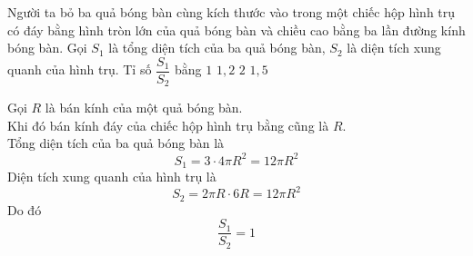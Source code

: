 \begin{ex}%
 Người ta bỏ ba quả bóng bàn cùng kích thước vào trong một chiếc hộp hình trụ có đáy bằng hình tròn lớn của quả bóng bàn và chiều cao bằng ba lần đường kính bóng bàn. Gọi $S_1$ là tổng diện tích của ba quả bóng bàn, $S_2$ là diện tích xung quanh của hình trụ. Tỉ số $\dfrac{S_1}{S_2}$ bằng
 \choice
  {\True $1$}
  {$1{,}2$}
  {$2$}
  {$1{,}5$}
 \loigiai
  {
  \immini
   {
   Gọi $R$ là bán kính của một quả bóng bàn.\\Khi đó bán kính đáy của chiếc hộp hình trụ bằng cũng là $R$.\\
   Tổng diện tích của ba quả bóng bàn là $$S_1 = 3 \cdot 4 \pi R^2 = 12 \pi R^2$$
   Diện tích xung quanh của hình trụ là $$S_2 = 2 \pi R \cdot 6R = 12 \pi R^2$$
   Do đó $$\dfrac{S_1}{S_2} = 1$$
   }
   {
   }
  }
\end{ex}

